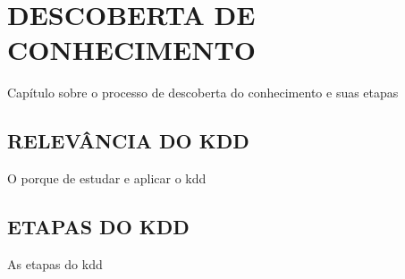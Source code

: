 
\chapter{DESCOBERTA DE CONHECIMENTO}
\label{chap:descobertaConhecimento}
Capítulo sobre o processo de descoberta do conhecimento e suas etapas

\section{RELEVÂNCIA DO KDD}
\label{sec:relevanciaKDD}
O porque de estudar e aplicar o kdd

\section{ETAPAS DO KDD}
\label{sec:etapasKDD}
As etapas do kdd